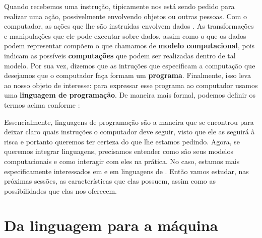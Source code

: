     Quando recebemos uma instrução, tipicamente nos está sendo pedido para
    realizar uma ação, possivelmente envolvendo objetos ou outras pessoas. Com o
    computador, as ações que lhe são instruídas envolvem dados
    \cite{org&arch:00}. As transformações e manipulações que ele pode executar
    sobre dados, assim como o que os dados podem representar compõem o que
    chamamos de \textbf{modelo computacional}, pois indicam as possíveis
    \textbf{computações} que podem ser realizadas dentro de tal modelo. Por sua
    vez, dizemos que as intruções que especificam a computação que desejamos que
    o computador faça formam um \textbf{programa}. Finalmente, isso leva ao
    nosso objeto de interesse: para expressar esse programa ao computador usamos
    uma \textbf{linguagem de programação}. De maneira mais formal, podemos
    definir os termos acima conforme \cite{pl:00}:

    \vspace{2em}

    
    Essencialmente, linguagens de programação são a maneira que se encontrou
    para deixar claro quais instruções o computador deve seguir, visto que ele
    as seguirá à risca e portanto queremos ter certeza do que lhe estamos
    pedindo. Agora, se queremos integrar linguagens, precisamos entender como
    são seus modelos computacionais e como interagir com eles na prática. No
    caso, estamos mais especificamente interessados em \CXX{} e em linguagens de
    \script{}. Então vamos estudar, nas próximas sessões, as características que
    elas possuem, assim como as possibilidades que elas nos oferecem.

  \section{Da linguagem para a máquina}
  \label{cap:conceitos:maquina}

